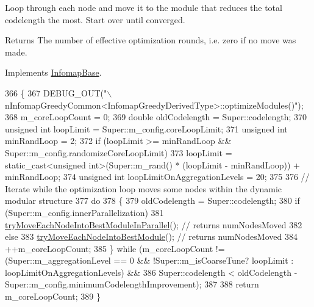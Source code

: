 Loop through each node and move it to the module that reduces the total codelength the most. Start over until converged.

\begin{DoxyReturn}{Returns}
The number of effective optimization rounds, i.\+e. zero if no move was made. 
\end{DoxyReturn}


Implements \mbox{\hyperlink{classInfomapBase_a443a496b76cc78286cce345e018c4fd8}{Infomap\+Base}}.


\begin{DoxyCode}
366 \{
367     DEBUG\_OUT(\textcolor{stringliteral}{"\(\backslash\)nInfomapGreedyCommon<InfomapGreedyDerivedType>::optimizeModules()"});
368     m\_coreLoopCount = 0;
369     \textcolor{keywordtype}{double} oldCodelength = Super::codelength;
370     \textcolor{keywordtype}{unsigned} \textcolor{keywordtype}{int} loopLimit = Super::m\_config.coreLoopLimit;
371     \textcolor{keywordtype}{unsigned} \textcolor{keywordtype}{int} minRandLoop = 2;
372     \textcolor{keywordflow}{if} (loopLimit >= minRandLoop && Super::m\_config.randomizeCoreLoopLimit)
373         loopLimit = \textcolor{keyword}{static\_cast<}\textcolor{keywordtype}{unsigned} \textcolor{keywordtype}{int}\textcolor{keyword}{>}(Super::m\_rand() * (loopLimit - minRandLoop)) + minRandLoop;
374     \textcolor{keywordtype}{unsigned} \textcolor{keywordtype}{int} loopLimitOnAggregationLevels = 20;
375 
376     \textcolor{comment}{// Iterate while the optimization loop moves some nodes within the dynamic modular structure}
377     \textcolor{keywordflow}{do}
378     \{
379         oldCodelength = Super::codelength;
380         \textcolor{keywordflow}{if} (Super::m\_config.innerParallelization)
381             \mbox{\hyperlink{classInfomapGreedyCommon_aebf032fcd793b9496e5b1952cb14c233}{tryMoveEachNodeIntoBestModuleInParallel}}(); \textcolor{comment}{// returns
       numNodesMoved}
382         \textcolor{keywordflow}{else}
383             \mbox{\hyperlink{classInfomapGreedyCommon_a25af363aae49138b379a823b6ab2ad5c}{tryMoveEachNodeIntoBestModule}}(); \textcolor{comment}{// returns numNodesMoved}
384         ++m\_coreLoopCount;
385     \} \textcolor{keywordflow}{while} (m\_coreLoopCount != (Super::m\_aggregationLevel == 0 && !Super::m\_isCoarseTune? loopLimit : 
      loopLimitOnAggregationLevels) &&
386             Super::codelength < oldCodelength - Super::m\_config.minimumCodelengthImprovement);
387 
388     \textcolor{keywordflow}{return} m\_coreLoopCount;
389 \}
\end{DoxyCode}
\mbox{\label{classInfomapGreedyCommon_a3b5e71572ae01ce0788f919290903b63}} 
